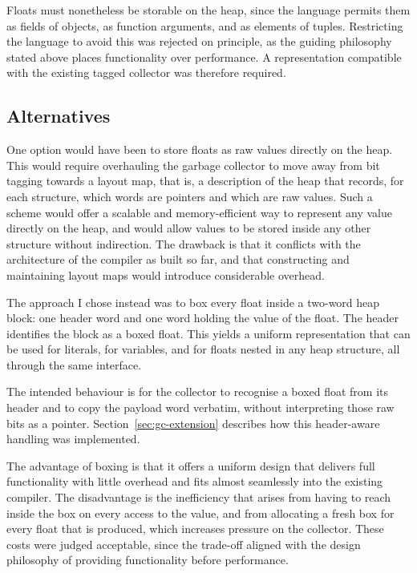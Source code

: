 Floats must nonetheless be storable on the heap, since the language permits them as fields of objects, as function arguments, and as elements of tuples. Restricting the language to avoid this was rejected on principle, as the guiding philosophy stated above places functionality over performance. A representation compatible with the existing tagged collector was therefore required.

\subsection{Alternatives}

One option would have been to store floats as raw values directly on the heap. This would require overhauling the garbage collector to move away from bit tagging towards a layout map, that is, a description of the heap that records, for each structure, which words are pointers and which are raw values. Such a scheme would offer a scalable and memory-efficient way to represent any value directly on the heap, and would allow values to be stored inside any other structure without indirection. The drawback is that it conflicts with the architecture of the compiler as built so far, and that constructing and maintaining layout maps would introduce considerable overhead.

The approach I chose instead was to box every float inside a two-word heap block: one header word and one word holding the value of the float. The header identifies the block as a boxed float. This yields a uniform representation that can be used for literals, for variables, and for floats nested in any heap structure, all through the same interface.

The intended behaviour is for the collector to recognise a boxed float from its header and to copy the payload word verbatim, without interpreting those raw bits as a pointer. Section~\ref{sec:gc-extension} describes how this header-aware handling was implemented.

The advantage of boxing is that it offers a uniform design that delivers full functionality with little overhead and fits almost seamlessly into the existing compiler. The disadvantage is the inefficiency that arises from having to reach inside the box on every access to the value, and from allocating a fresh box for every float that is produced, which increases pressure on the collector. These costs were judged acceptable, since the trade-off aligned with the design philosophy of providing functionality before performance.


